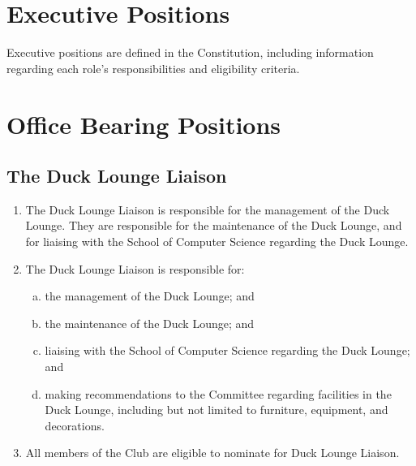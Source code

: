 \documentclass{schedule}
\begin{document}
\section{Executive Positions}
Executive positions are defined in the Constitution, including information regarding each role's responsibilities and eligibility criteria.


\section{Office Bearing Positions}

\subsection{The Duck Lounge Liaison}
\begin{enumerate}[(1)]
    \item The Duck Lounge Liaison is responsible for the management of the Duck Lounge. They are responsible for the maintenance of the Duck Lounge, and for liaising with the School of Computer Science regarding the Duck Lounge.
    \item The Duck Lounge Liaison is responsible for:
          \begin{enumerate}[(a)]
              \item the management of the Duck Lounge; and
              \item the maintenance of the Duck Lounge; and
              \item liaising with the School of Computer Science regarding the Duck Lounge; and
              \item making recommendations to the Committee regarding facilities in the Duck Lounge, including but not limited to furniture, equipment, and decorations.
          \end{enumerate}
    \item All members of the Club are eligible to nominate for Duck Lounge Liaison.
\end{enumerate}
\end{document}
